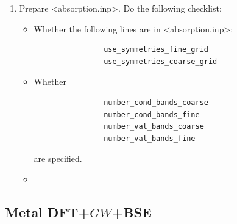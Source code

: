 \documentclass[hyperref, a4paper]{report}
\def\texttt#1{<#1>}%
\newcommand{\shortcode}[1]{\texttt{#1}}
\begin{document}
\begin{enumerate}
\begin{enumerate}
        \item Prepare \shortcode{absorption.inp}. Do the following checklist:
        \begin{itemize}
            \item Whether the following lines are in \shortcode{absorption.inp}:
            \begin{lstlisting}
                use_symmetries_fine_grid
                use_symmetries_coarse_grid
            \end{lstlisting}
            \item Whether 
            \begin{lstlisting}
                number_cond_bands_coarse
                number_cond_bands_fine
                number_val_bands_coarse
                number_val_bands_fine
            \end{lstlisting}
            are specified.
            \item 
        \end{itemize}
    \end{enumerate}
\end{enumerate}

\subsection{Metal DFT+$GW$+BSE}\label{sec:metal-sop}
\end{document}
